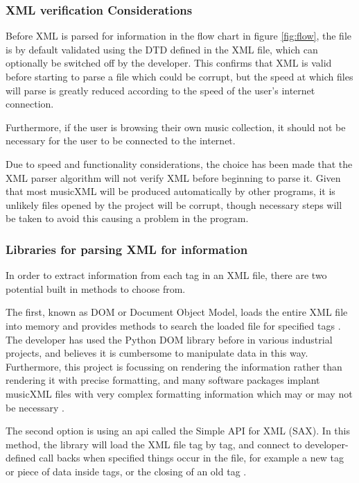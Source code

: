 \subsubsection{XML verification Considerations}
Before XML is parsed for information in the flow chart in figure \ref{fig:flow}, the file is by default validated using the DTD defined in the XML file, which can optionally be switched off by the developer. This confirms that XML is valid before starting to parse a file which could be corrupt, but the speed at which files will parse is greatly reduced according to the speed of the user's internet connection.

Furthermore, if the user is browsing their own music collection, it should not be necessary for the user to be connected to the internet.

Due to speed and functionality considerations, the choice has been made that the XML parser algorithm will not verify XML before beginning to parse it. Given that most musicXML will be produced automatically by other programs, it is unlikely files opened by the project will be corrupt, though necessary steps will be taken to avoid this causing a problem in the program.


\subsubsection{Libraries for parsing XML for information}
In order to extract information from each tag in an XML file, there are two potential built in methods to choose from. 

The first, known as DOM or Document Object Model, loads the entire XML file into memory and provides methods to search the loaded file for specified tags \parencite{PythonDom}. The developer has used the Python DOM library before in various industrial projects, and believes it is cumbersome to manipulate data in this way. Furthermore, this project is focussing on rendering the information rather than rendering it with precise formatting, and many software packages implant musicXML files with very complex formatting information which may or may not be necessary \parencite{MusicXMLPresentation}.

The second option is using an api called the Simple API for XML (SAX). In this method, the library will load the XML file tag by tag, and connect to developer-defined call backs when specified things occur in the file, for example a new tag or piece of data inside tags, or the closing of an old tag \parencite{PythonSax}. 


